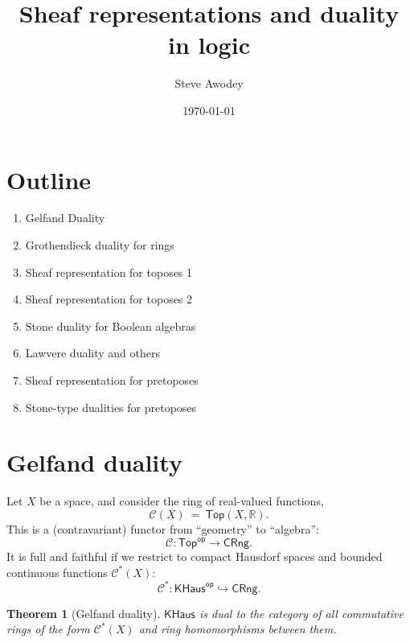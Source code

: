 \documentclass[11pt]{article}
\newtheorem{theorem}{Theorem}
\theoremstyle{remark}
\theoremstyle{definition}
\begin{document}

\title{
{Sheaf representations and duality in logic}
}
\author{Steve Awodey
}
\date{
\today}

\maketitle

\section{Outline}


\begin{enumerate}
\item Gelfand Duality

\item Grothendieck duality for rings

\item Sheaf representation for toposes 1%


\item Sheaf representation for toposes 2%

\item Stone duality for Boolean algebras

\item Lawvere duality and others

\item Sheaf representation for pretoposes

\item Stone-type dualities for pretoposes

\end{enumerate}

\section{Gelfand duality}
Let $X$ be a  space, and consider the ring of real-valued functions,
\[
 \mathcal{C}(X)\ =\ \mathsf{Top}(X, \mathbb{R}).
 \]
 This  is a (contravariant) functor from ``geometry'' to ``algebra'':
 \[
 \mathcal{C} : \mathsf{Top}^\mathsf{op} \to \mathsf{CRng}.
 \]
%
It is full and faithful if we restrict to compact Hausdorf spaces and bounded continuous functions  $\mathcal{C}^*(X)$:
  \[
 \mathcal{C}^* : \mathsf{KHaus}^\mathsf{op} \hookrightarrow \mathsf{CRng}.
 \]
 \begin{theorem}[Gelfand duality]
 $\mathsf{KHaus}$ is dual to the category of all commutative rings of the form  $\mathcal{C}^*(X)$ and ring homomorphisms between them.
 \end{theorem}
 \medskip
 
\end{document}

